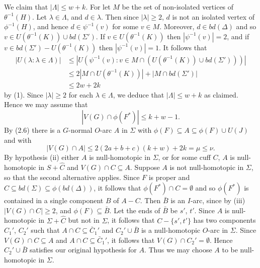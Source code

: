 We claim that $|\Lambda| \le w + k$. For let $M$ be the set of non-isolated vertices of $\theta^{-1}(H)$. Let $\lambda \in \Lambda$, and $d \in \lambda$. Then since $|\lambda| \ge 2$, $d$ is not an isolated vertex of $\phi^{-1}(H)$, and hence $d \in \psi^{-1}(v)$ for some $v \in M$. Moreover, $d \in bd(\Delta)$ and so $v \in U(\theta^{-1}(K)) \cup bd(\Sigma')$. If $v \in U(\theta^{-1}(K))$ then $|\psi^{-1}(v)| = 2$, and if $v \in bd(\Sigma') - U(\theta^{-1}(K))$ then $|\psi^{-1}(v)| = 1$. It follows that
\begin{align*}
\left| U(\lambda : \lambda \in \Lambda) \right| & \le \left| U(\psi^{-1}(v) : v \in M \cap (U(\theta^{-1}(K)) \cup bd(\Sigma'))) \right| \\
& \le 2\left| M \cap U(\theta^{-1}(K)) \right| + |M \cap bd(\Sigma')| \\
& \le 2w + 2k
\end{align*}
by (1). Since $|\lambda| \ge 2$ for each $\lambda \in \Lambda$, we deduce that $|\Lambda| \le w + k$ as claimed. Hence we may assume that
\begin{equation*}
|V(G) \cap \phi(F^*)| \le k + w - 1.
\end{equation*}
By (2.6) there is a $G$-normal $O$-arc $A$ in $\Sigma$ with $\phi(F) \subseteq A \subseteq \phi(F) \cup U(J)$ and with
\begin{equation*}
|V(G) \cap A| \le 2(2a + b + c)(k + w) + 2k = \mu \le \nu.
\end{equation*}
By hypothesis (ii) either $A$ is null-homotopic in $\Sigma$, or for some cuff $C$, $A$ is null-homotopic in $S + \hat{C}$ and $V(G) \cap C \subseteq A$. Suppose $A$ is not null-homotopic in $\Sigma$, so that the second alternative applies. Since $F$ is proper and $C \subseteq bd(\Sigma) \subseteq \phi(bd(\Delta))$, it follows that $\phi(F^*) \cap C = \emptyset$ and so $\phi(F^*)$ is contained in a single component $B$ of $A - C$. Then $\bar{B}$ is an $I$-arc, since by (iii) $|V(G) \cap C| \ge 2$, and $\phi(F) \subseteq \bar{B}$. Let the ends of $\bar{B}$ be $s'$, $t'$. Since $A$ is null-homotopic in $\Sigma + \hat{C}$ but not in $\Sigma$, it follows that $C - \{s', t'\}$ has two components $C_1'$, $C_2'$ such that $A \cap C \subseteq \bar{C}_1'$ and $C_2' \cup \bar{B}$ is a null-homotopic $O$-arc in $\Sigma$. Since $V(G) \cap C \subseteq A$ and $A \cap C \subseteq \bar{C}_1'$, it follows that $V(G) \cap C_2' = \emptyset$. Hence $C_2' \cup \bar{B}$ satisfies our original hypothesis for $A$. Thus we may choose $A$ to be null-homotopic in $\Sigma$.

